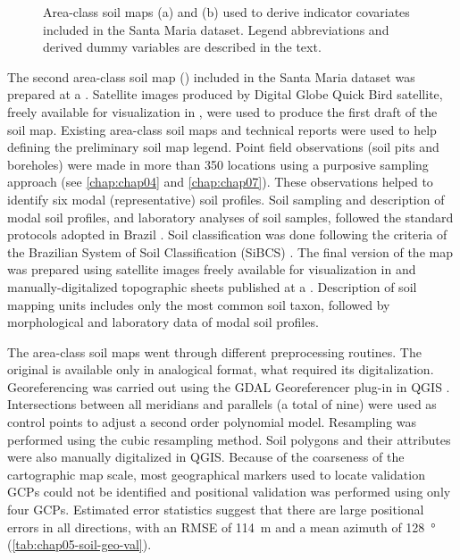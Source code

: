 \begin{figure}[!ht]
\begin{minipage}[b]{0.45\textwidth}
\end{minipage} 
\caption[Area-class soil maps included in the Santa Maria dataset.]{Area-class soil maps (a) \soilOld{} and (b) 
\soilNew{} used to derive indicator covariates included in the Santa Maria dataset. Legend abbreviations and 
derived dummy variables are described in the text.}
\label{fig:chap05-soil-maps}
\end{figure}

The second area-class soil map (\soilNew) included in the Santa Maria dataset \cite{Miguel2010} was prepared 
at a . Satellite images produced by Digital Globe\textregistered{} Quick Bird satellite, freely 
available for visualization in \googleearth, were used to produce the first draft of the soil 
map. Existing area-class soil maps and technical reports \cite{Pedron2005, Poelking2007, Sturmer2008} were 
used to help defining the preliminary soil map legend. Point field observations (soil pits and boreholes) were 
made in more than \num{350} locations using a purposive sampling approach (see \autoref{chap:chap04} and 
\autoref{chap:chap07}). These observations helped to identify six modal (representative) soil profiles. Soil 
sampling and description of modal soil profiles, and laboratory analyses of soil samples, followed the standard 
protocols adopted in Brazil \cite{ClaessenEtAl1997, SantosEtAl2005}. Soil classification was done following the 
criteria of the Brazilian System of Soil Classification (SiBCS) \cite{SantosEtAl2006}. The final version of the 
map was prepared using satellite images freely available for visualization in \googleearth{} and 
manually-digitalized topographic sheets published at a  \cite{DSG1992a, DSG1992}. Description of 
soil mapping units includes only the most common soil taxon, followed by morphological and laboratory data of 
modal soil profiles.

The area-class soil maps went through different preprocessing routines. The original \soilOld{} is available 
only in analogical format, what required its digitalization. Georeferencing was carried out using the GDAL 
Georeferencer plug-in in QGIS \cite{GDAL2013, QGIS2013}. Intersections between all meridians and parallels (a 
total of nine) were used as control points to adjust a second order polynomial model. Resampling was performed 
using the cubic resampling method. Soil polygons and their attributes were also manually digitalized in QGIS. 
Because of the coarseness of the cartographic map scale, most geographical markers used to locate validation 
GCPs could not be identified and positional validation was performed using only four GCPs. Estimated error 
statistics suggest that there are large positional errors in all directions, with an RMSE of \SI{114}{\m} and 
a mean azimuth of \SI{128}{\degree} (\autoref{tab:chap05-soil-geo-val}).

